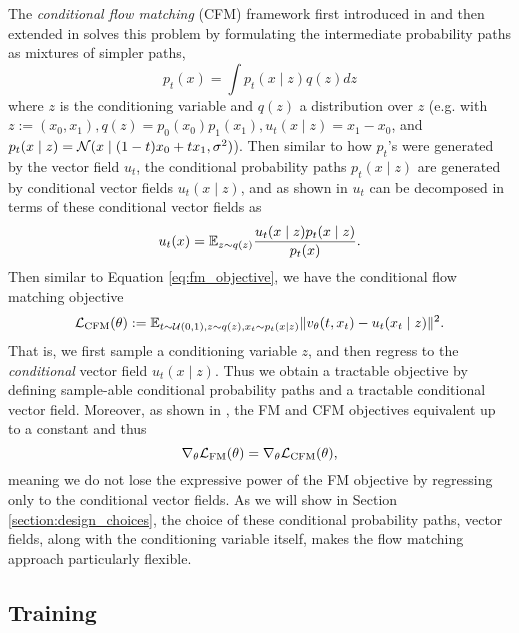 The \textit{conditional flow matching} (CFM) framework first introduced in \citep{lipmanFlowMatchingGenerative2023} and then extended in \citep{tongImprovingGeneralizingFlowbased2023} solves this problem by formulating the intermediate probability paths as mixtures of simpler paths, 
\begin{equation}
    p_t(x) = \int p_t(x \mid z) q(z) dz
\end{equation}
where $z$ is the conditioning variable and $q(z)$ a distribution over $z$ (e.g. with $z := (x_0, x_1), q(z) = p_0(x_0)p_1(x_1), u_t(x \mid z) = x_1 - x_0$, and $p_t(x \mid z) = \mathcal{N}(x \mid (1-t)x_0 + tx_1, \sigma^2)$). Then similar to how $p_t$'s were generated by the vector field $u_t$, the conditional probability paths $p_t(x \mid z)$ are generated by conditional vector fields $u_t(x \mid z)$, and as shown in \citep{tongImprovingGeneralizingFlowbased2023} $u_t$ can be decomposed in terms of these conditional vector fields as 
\begin{equation}
    u_t(x) = \mathbb{E}_{z \sim q(z)} \frac{u_t(x \mid z) p_t(x \mid z)}{p_t(x)}.
\end{equation}
Then similar to Equation \ref{eq:fm_objective}, we have the conditional flow matching objective 
\begin{equation} \label{eq:cfm_objective}
    \mathcal{L}_{\text{CFM}}(\theta) := \mathbb{E}_{t \sim \mathcal{U}(0,1), z \sim q(z), x_t \sim p_t(x \mid z)}
    \Vert v_\theta(t, x_t) - u_t(x_t \mid z) \Vert ^2.
\end{equation}
That is, we first sample a conditioning variable $z$, and then regress to the \textit{conditional} vector field $u_t(x \mid z)$. Thus we obtain a tractable objective by defining sample-able conditional probability paths and a tractable conditional vector field. Moreover, as shown in \citep{tongImprovingGeneralizingFlowbased2023}, the FM and CFM objectives equivalent up to a constant and thus 
\begin{equation}
    \nabla_\theta \mathcal{L}_{\text{FM}}(\theta) = \nabla_\theta \mathcal{L}_{\text{CFM}}(\theta),
\end{equation}
meaning we do not lose the expressive power of the FM objective by regressing only to the conditional vector fields. As we will show in Section \ref{section:design_choices}, the choice of these conditional probability paths, vector fields, along with the conditioning variable itself, makes the flow matching approach particularly flexible.

\subsection{Training} \label{sec:fm_training}

